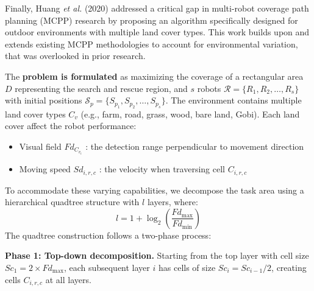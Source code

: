 Finally, Huang \textit{et al.} (2020) \cite{9207908} addressed a critical gap in multi-robot coverage path planning (MCPP) research by proposing an algorithm specifically designed for outdoor environments with multiple land cover types. This work builds upon and extends existing MCPP methodologies to account for environmental variation, that was overlooked in prior research.

The \textbf{problem is formulated} as maximizing the coverage of a rectangular area $D$ representing the search and rescue region, and $s$ robots $\mathcal{R} = \{R_1, R_2, \ldots, R_s\}$ with initial positions $\mathcal{S}_p = \{S_{p_1}, S_{p_2}, \ldots, S_{p_s}\}$. The environment contains multiple land cover types $C_v$ (e.g., farm, road, grass, wood, bare land, Gobi). Each land cover affect the robot performance:
\begin{itemize}
    \item Visual field $Fd_{C_{v_i}}$ : the detection range perpendicular to movement direction
    \item Moving speed $Sd_{i,r,c}$ : the velocity when traversing cell $C_{i,r,c}$
\end{itemize} 
To accommodate these varying capabilities, we decompose the task area using a hierarchical quadtree structure with $l$ layers, where:
\begin{equation}
    l = 1 + \log_2\left(\frac{Fd_{\max}}{Fd_{\min}}\right)
\end{equation}
The quadtree construction follows a two-phase process:

\textbf{Phase 1: Top-down decomposition.} Starting from the top layer with cell size $Sc_1 = 2 \times Fd_{\max}$, each subsequent layer $i$ has cells of size $Sc_i = Sc_{i-1}/2$, creating cells $C_{i,r,c}$ at all layers.

